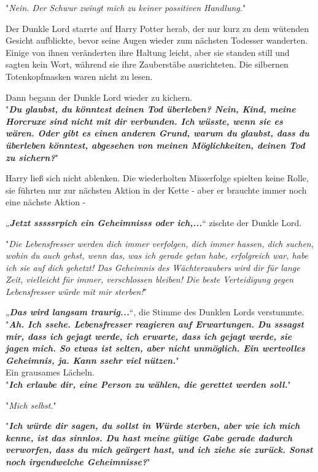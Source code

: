 {"\emph{Nein. Der Schwur zwingt mich zu keiner possitiven Handlung.}"

Der Dunkle Lord starrte auf Harry Potter herab, der nur kurz zu dem wütenden Gesicht aufblickte, bevor seine Augen wieder zum nächsten Todesser wanderten.\\ Einige von ihnen veränderten ihre Haltung leicht, aber sie standen still und sagten kein Wort, während sie ihre Zauberstäbe ausrichteten. Die silbernen Totenkopfmasken waren nicht zu lesen.

Dann begann der Dunkle Lord wieder zu kichern.\\ "\textbf{\emph{Du glaubst, du könntest deinen Tod überleben? Nein, Kind, meine Horcruxe sind nicht mit dir verbunden. Ich wüsste, wenn sie es wären. Oder gibt es einen anderen Grund, warum du glaubst, dass du überleben könntest, abgesehen von meinen Möglichkeiten, deinen Tod zu sichern?}}"

Harry ließ sich nicht ablenken. Die wiederholten Misserfolge spielten keine Rolle, sie führten nur zur nächsten Aktion in der Kette - aber er brauchte immer noch eine nächste Aktion -

„\textbf{\emph{Jetzt sssssrpich ein Geheimnisss oder ich,...}}“ zischte der Dunkle Lord.

"\emph{Die Lebensfresser werden dich immer verfolgen, dich immer hassen, dich suchen, wohin du auch gehst, wenn das, was ich gerade getan habe, erfolgreich war, habe ich sie auf dich gehetzt! Das Geheimnis des Wächterzaubers wird dir für lange Zeit, vielleicht für immer, verschlossen bleiben! Die beste Verteidigung gegen Lebensfresser würde mit mir sterben!}"

„\textbf{\emph{Das wird langsam traurig...}}“, die Stimme des Dunklen Lords verstummte.\\ "\textbf{\emph{Ah. Ich ssehe. Lebensfresser reagieren auf Erwartungen. Du sssagst mir, dass ich gejagt werde, ich erwarte, dass ich gejagt werde, sie jagen mich. So etwas ist selten, aber nicht unmöglich. Ein wertvolles Geheimnis, ja. Kann ssehr viel nützen.}}"\\ Ein grausames Lächeln.\\ "\textbf{\emph{Ich erlaube dir, eine Person zu wählen, die gerettet werden soll.}}"

"\emph{Mich selbst.}"

"\textbf{\emph{Ich würde dir sagen, du sollst in Würde sterben, aber wie ich mich kenne, ist das sinnlos. Du hast meine gütige Gabe gerade dadurch verworfen, dass du mich geärgert hast, und ich ziehe sie zurück. Sonst noch irgendwelche Geheimnisse?}}"

}
